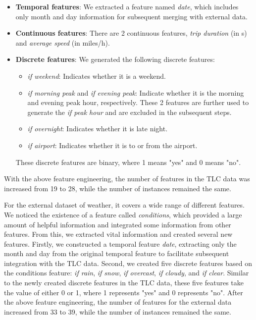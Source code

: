 \documentclass[11pt]{article}
\begin{document}
\begin{itemize}
    \item \textbf{Temporal features}: We extracted a feature named \textit{date}, which includes only month and day information for subsequent merging with external data.
    
    \item \textbf{Continuous features}: There are 2 continuous features, \textit{trip duration} (in s) and \textit{average speed} (in miles/h).
    
    \item \textbf{Discrete features}: We generated the following discrete features:
    \begin{itemize}
        \item \textit{if weekend}: Indicates whether it is a weekend.
        \item \textit{if morning peak} and \textit{if evening peak}: Indicate whether it is the morning and evening peak hour, respectively. These 2 features are further used to generate the \textit{if peak hour} and are excluded in the subsequent steps.
        \item \textit{if overnight}: Indicates whether it is late night.
        \item \textit{if airport}: Indicates whether it is to or from the airport.
    \end{itemize}
    These discrete features are binary, where 1 means "yes" and 0 means "no".
\end{itemize}
With the above feature engineering, the number of features in the TLC data was increased from 19 to 28, while the number of instances remained the same.

For the external dataset of weather, it covers a wide range of different features. We noticed the existence of a feature called \textit{conditions}, which provided a large amount of helpful information and integrated some information from other features. From this, we extracted vital information and created several new features. Firstly, we constructed a temporal feature \textit{date}, extracting only the month and day from the original temporal feature to facilitate subsequent integration with the TLC data. Second, we created five discrete features based on the conditions feature: \textit{if rain}, \textit{if snow}, \textit{if overcast}, \textit{if cloudy}, and \textit{if clear}. Similar to the newly created discrete features in the TLC data, these five features take the value of either 0 or 1, where 1 represents "yes" and 0 represents "no". After the above feature engineering, the number of features for the external data increased from 33 to 39, while the number of instances remained the same.
\end{document}
